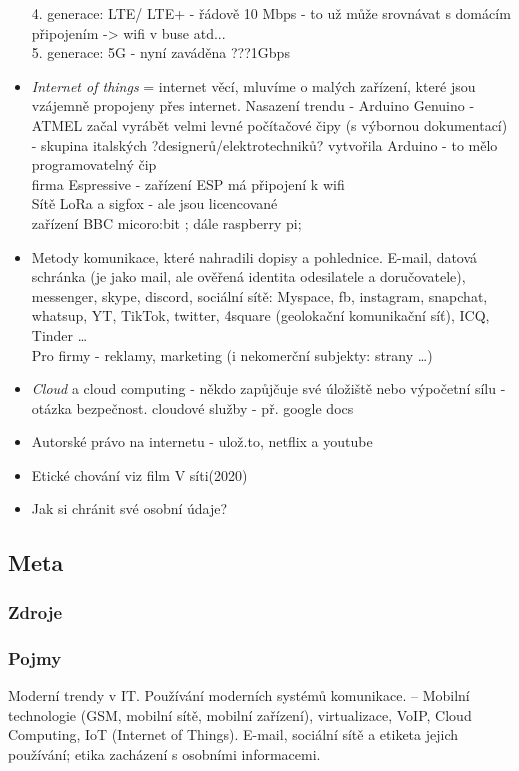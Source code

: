 \documentclass[12pt]{article}
\begin{document}
\begin{itemize}
4. generace: LTE/ LTE+ - řádově 10 Mbps - to už může srovnávat s domácím připojením -> wifi v buse atd...\\
5. generace: 5G - nyní zaváděna ???1Gbps\\
\item \emph{Internet of things} = internet věcí, mluvíme o malých zařízení, které jsou vzájemně propojeny přes internet. Nasazení trendu - Arduino Genuino - ATMEL začal vyrábět velmi levné počítačové čipy (s výbornou dokumentací) - skupina italských ?designerů/elektrotechniků? vytvořila Arduino - to mělo programovatelný čip\\
firma Espressive - zařízení ESP má připojení k wifi\\
Sítě LoRa a sigfox - ale jsou licencované\\
zařízení BBC micoro:bit ; dále raspberry pi;
\item Metody komunikace, které nahradili dopisy a pohlednice. E-mail, datová schránka (je jako mail, ale ověřená identita odesilatele a doručovatele), messenger, skype, discord, sociální sítě: Myspace, fb, instagram, snapchat, whatsup, YT, TikTok, twitter, 4square (geolokační komunikační síť), ICQ, Tinder \dots \\
Pro firmy - reklamy, marketing (i nekomerční subjekty: strany \dots)
\item \emph{Cloud} a cloud computing - někdo zapůjčuje své úložiště nebo výpočetní sílu - otázka bezpečnost.  cloudové služby - př. google docs\\
\item Autorské právo na internetu - ulož.to, netflix a youtube
\item Etické chování viz film V síti(2020)
\item Jak si chránit své osobní údaje?
\end{itemize}
\subsection{Meta}
\subsubsection{Zdroje}
\subsubsection{Pojmy}
Moderní trendy v IT. Používání moderních systémů komunikace. – Mobilní technologie (GSM, mobilní sítě, mobilní zařízení), virtualizace, VoIP, Cloud Computing, IoT (Internet of Things). E-mail, sociální sítě a etiketa jejich používání; etika zacházení s osobními informacemi. 
\end{document}
